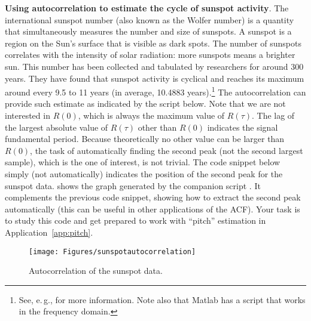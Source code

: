 \bApplication \textbf{Using autocorrelation to estimate the cycle of sunspot activity}.
The international sunspot number (also known as the Wolfer number) is a quantity that simultaneously measures the number and size of sunspots. A sunspot is a region on the Sun's surface that is visible as dark spots. 
The number of sunspots correlates with the intensity of solar radiation: more sunspots means a brighter sun. 
This number has been collected and tabulated by researchers for around 300 years. They have found that sunspot activity is cyclical and reaches its maximum around every 9.5 to 11 years (in average, 10.4883 years).\footnote{See, e.\,g.,  for more information. Note also that Matlab has a script  that works in the frequency domain.}
The autocorrelation can provide such estimate as indicated by the script below. Note that we are not interested in $R(0)$, which is always the maximum value of $R(\tau)$. The lag of the largest absolute value of $R(\tau)$ other than $R(0)$ indicates the signal fundamental period. Because theoretically no other value can be larger than $R(0)$, the task of automatically finding the second peak (not the second largest sample), which is the one of interest, is not trivial. The code snippet below simply (not automatically) indicates the position of the second peak for the sunspot data.
 shows the graph generated by the companion script . It complements the previous code snippet, showing how to extract the second peak automatically (this can be useful in other applications of the ACF). Your task is to study this code and get prepared to work with ``pitch'' estimation in Application~\ref{app:pitch}.

\begin{figure}
	\centering
		\texttt{[image: Figures/sunspotautocorrelation]}		
	\caption{Autocorrelation of the sunspot data.\label{fig:sunspotautocorrelation}}
\end{figure}

